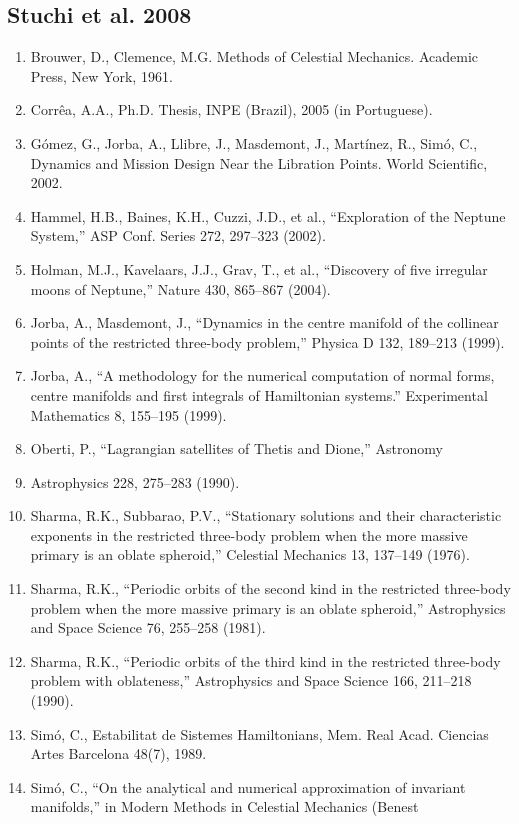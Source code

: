 \documentclass[12pt]{article}
\begin{document}
\subsection*{Stuchi et al. 2008}
\begin{enumerate}
\item Brouwer, D., Clemence, M.G. Methods of Celestial Mechanics. Academic Press, New York, 1961.
\item Corrêa, A.A., Ph.D. Thesis, INPE (Brazil), 2005 (in Portuguese).
\item Gómez, G., Jorba, A., Llibre, J., Masdemont, J., Martínez, R., Simó, C., Dynamics and Mission Design Near the Libration Points. World Scientific, 2002.
\item Hammel, H.B., Baines, K.H., Cuzzi, J.D., et al., ``Exploration of the Neptune System,'' ASP Conf. Series 272, 297--323 (2002).
\item Holman, M.J., Kavelaars, J.J., Grav, T., et al., ``Discovery of five irregular moons of Neptune,'' Nature 430, 865--867 (2004).
\item Jorba, A., Masdemont, J., ``Dynamics in the centre manifold of the collinear points of the restricted three-body problem,'' Physica D 132, 189--213 (1999).
\item Jorba, A., ``A methodology for the numerical computation of normal forms, centre manifolds and first integrals of Hamiltonian systems.'' Experimental Mathematics 8, 155--195 (1999).
\item Oberti, P., ``Lagrangian satellites of Thetis and Dione,'' Astronomy
\item Astrophysics 228, 275--283 (1990).
\item Sharma, R.K., Subbarao, P.V., ``Stationary solutions and their characteristic exponents in the restricted three-body problem when the more massive primary is an oblate spheroid,'' Celestial Mechanics 13, 137--149 (1976).
\item Sharma, R.K., ``Periodic orbits of the second kind in the restricted three-body problem when the more massive primary is an oblate spheroid,'' Astrophysics and Space Science 76, 255--258 (1981).
\item Sharma, R.K., ``Periodic orbits of the third kind in the restricted three-body problem with oblateness,'' Astrophysics and Space Science 166, 211--218 (1990).
\item Simó, C., Estabilitat de Sistemes Hamiltonians, Mem. Real Acad. Ciencias Artes Barcelona 48(7), 1989.
\item Simó, C., ``On the analytical and numerical approximation of invariant manifolds,'' in Modern Methods in Celestial Mechanics (Benest

\end{enumerate}
\end{document}
